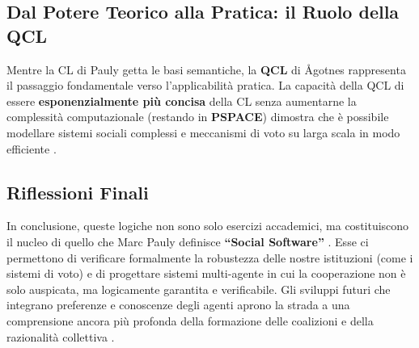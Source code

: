 \documentclass[12pt]{article}
\begin{document}
\subsection{Dal Potere Teorico alla Pratica: il Ruolo della QCL}

Mentre la CL di Pauly getta le basi semantiche, la \textbf{QCL} di Ågotnes
rappresenta il passaggio fondamentale verso l'applicabilità pratica. La
capacità della QCL di essere \textbf{esponenzialmente più concisa} della
CL senza aumentarne la complessità computazionale (restando in
\textbf{PSPACE}) dimostra che è possibile modellare sistemi sociali complessi
e meccanismi di voto su larga scala in modo efficiente .

\subsection{Riflessioni Finali}

In conclusione, queste logiche non sono solo esercizi accademici, ma
costituiscono il nucleo di quello che Marc Pauly definisce
\textbf{``Social Software''} . Esse ci permettono di verificare
formalmente la robustezza delle nostre istituzioni (come i sistemi di voto)
e di progettare sistemi multi-agente in cui la cooperazione non è solo
auspicata, ma logicamente garantita e verificabile. Gli sviluppi futuri
che integrano preferenze e conoscenze degli agenti aprono la strada a una
comprensione ancora più profonda della formazione delle coalizioni e della
razionalità collettiva .
\end{document}
